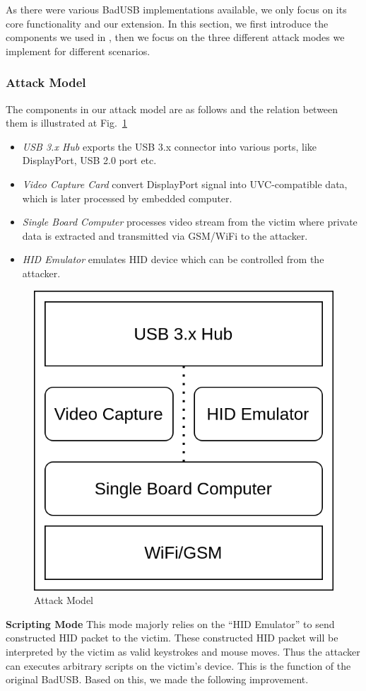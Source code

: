 As there were various BadUSB implementations available, we only focus on its core functionality and our extension. In this section, we first introduce the components we used in \tool, then we focus on the three different attack modes we implement  for different scenarios.

\subsubsection{Attack Model}
The components in our attack model are as follows and the relation between them is illustrated at Fig.~\ref{fig:attack_model}
\begin{itemize}
	\item\textit{USB 3.x Hub} exports the USB 3.x connector into various ports, like DisplayPort, USB 2.0 port etc.
	\item\textit{Video Capture Card} convert DisplayPort signal into UVC-compatible data, which is later processed by embedded computer.
	\item\textit{Single Board Computer} processes video stream from the victim where private data is extracted and transmitted via GSM/WiFi to the attacker.
	\item\textit{HID Emulator} emulates HID device which can be controlled from the attacker.
\end{itemize}
\begin{figure}[t]
	\centering
	\includegraphics[width=0.56\linewidth]{./Figs/attack_model.png}
	\caption{Attack Model}%
	\label{fig:attack_model}
\end{figure}
\textbf{Scripting Mode} This mode majorly relies on the ``HID Emulator'' to send constructed HID packet to the victim. These constructed HID packet will be interpreted by the victim as valid keystrokes and mouse moves. Thus the attacker can executes arbitrary scripts on the victim's device. This is the function of the original BadUSB. Based on this, we made the following improvement.

